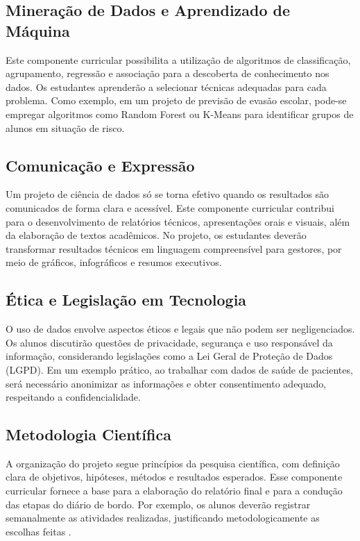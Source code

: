     \subsection{Mineração de Dados e Aprendizado de Máquina}
        Este componente curricular possibilita a utilização de algoritmos de classificação, agrupamento, regressão e associação para a descoberta de conhecimento nos dados. Os estudantes aprenderão a selecionar técnicas adequadas para cada problema. Como exemplo, em um projeto de previsão de evasão escolar, pode-se empregar algoritmos como Random Forest ou K-Means para identificar grupos de alunos em situação de risco.

    \subsection{Comunicação e Expressão}
        Um projeto de ciência de dados só se torna efetivo quando os resultados são comunicados de forma clara e acessível. Este componente curricular contribui para o desenvolvimento de relatórios técnicos, apresentações orais e visuais, além da elaboração de textos acadêmicos. No projeto, os estudantes deverão transformar resultados técnicos em linguagem compreensível para gestores, por meio de gráficos, infográficos e resumos executivos.

    \subsection{Ética e Legislação em Tecnologia}
        O uso de dados envolve aspectos éticos e legais que não podem ser negligenciados. Os alunos discutirão questões de privacidade, segurança e uso responsável da informação, considerando legislações como a Lei Geral de Proteção de Dados (LGPD). Em um exemplo prático, ao trabalhar com dados de saúde de pacientes, será necessário anonimizar as informações e obter consentimento adequado, respeitando a confidencialidade.

    \subsection{Metodologia Científica}
        A organização do projeto segue princípios da pesquisa científica, com definição clara de objetivos, hipóteses, métodos e resultados esperados. Esse componente curricular fornece a base para a elaboração do relatório final e para a condução das etapas do diário de bordo. Por exemplo, os alunos deverão registrar semanalmente as atividades realizadas, justificando metodologicamente as escolhas feitas \cite{abntex2cite}.

